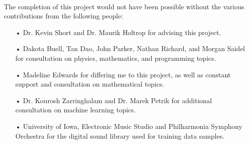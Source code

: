 \documentclass[12pt,letterpaper]{article}
\begin{document}
\paragraph*{}The completion of this project would not have been possible without the various contributions from the following people:

\begin{itemize}

\item[•]Dr. Kevin Short and Dr. Maurik Holtrop for advising this project.

\item[•]Dakota Buell, Tan Dao, John Parker, Nathan Richard, and Morgan Saidel for consultation on physics, mathematics, and programming topics.

\item[•]Madeline Edwards for differing me to this project, as well as constant support and consultation on mathematical topics.

\item[•]Dr. Kourosh Zarringhalam and Dr. Marek Petrik for additional consultation on machine learning topics.

\item[•]University of Iowa, Electronic Music Studio and Philharmonia Symphony Orchestra for the digital sound library used for training data samples.

\end{itemize}


\newpage
\end{document}
